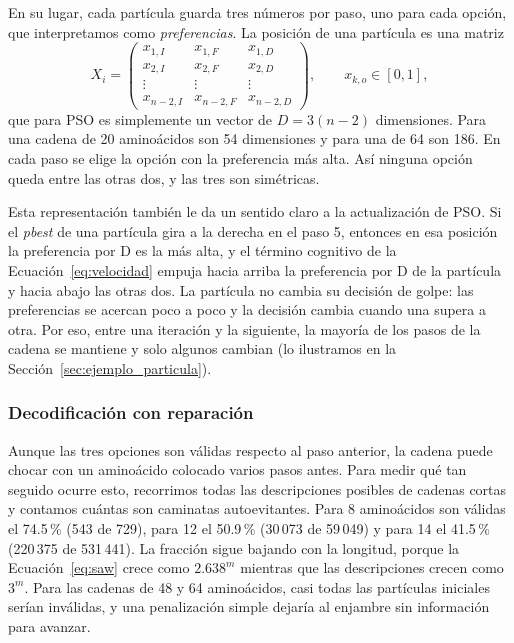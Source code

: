 En su lugar, cada partícula guarda tres números por paso, uno para cada opción, que interpretamos como \textit{preferencias}. La posición de una partícula es una matriz
\begin{equation}
X_i = \begin{pmatrix}
x_{1,I} & x_{1,F} & x_{1,D} \\
x_{2,I} & x_{2,F} & x_{2,D} \\
\vdots & \vdots & \vdots \\
x_{n-2,I} & x_{n-2,F} & x_{n-2,D}
\end{pmatrix}, \qquad x_{k,o} \in [0, 1],
\end{equation}
que para PSO es simplemente un vector de $D = 3(n-2)$ dimensiones. Para una cadena de 20 aminoácidos son 54 dimensiones y para una de 64 son 186. En cada paso se elige la opción con la preferencia más alta. Así ninguna opción queda entre las otras dos, y las tres son simétricas.

Esta representación también le da un sentido claro a la actualización de PSO. Si el \textit{pbest} de una partícula gira a la derecha en el paso 5, entonces en esa posición la preferencia por D es la más alta, y el término cognitivo de la Ecuación~\eqref{eq:velocidad} empuja hacia arriba la preferencia por D de la partícula y hacia abajo las otras dos. La partícula no cambia su decisión de golpe: las preferencias se acercan poco a poco y la decisión cambia cuando una supera a otra. Por eso, entre una iteración y la siguiente, la mayoría de los pasos de la cadena se mantiene y solo algunos cambian (lo ilustramos en la Sección~\ref{sec:ejemplo_particula}).

\subsubsection{Decodificación con reparación}

Aunque las tres opciones son válidas respecto al paso anterior, la cadena puede chocar con un aminoácido colocado varios pasos antes. Para medir qué tan seguido ocurre esto, recorrimos todas las descripciones posibles de cadenas cortas y contamos cuántas son caminatas autoevitantes. Para 8 aminoácidos son válidas el 74.5\,\% (543 de 729), para 12 el 50.9\,\% (30\,073 de 59\,049) y para 14 el 41.5\,\% (220\,375 de 531\,441). La fracción sigue bajando con la longitud, porque la Ecuación~\eqref{eq:saw} crece como $2.638^m$ mientras que las descripciones crecen como $3^m$. Para las cadenas de 48 y 64 aminoácidos, casi todas las partículas iniciales serían inválidas, y una penalización simple dejaría al enjambre sin información para avanzar.

